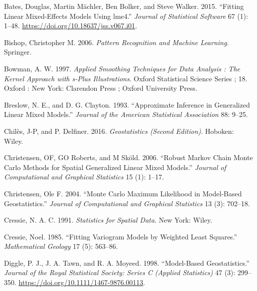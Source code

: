 \documentclass[
  letterpaper,
]{krantz}
\newlength{\cslhangindent}
\newlength{\cslentryspacingunit} %
\newenvironment{CSLReferences}[2] %
 {%
  \setlength{\parindent}{0pt}
  \ifodd #1
  \let\oldpar\par
  \def\par{\hangindent=\cslhangindent\oldpar}
  \fi
  \setlength{\parskip}{#2\cslentryspacingunit}
 }%
 {}
\begin{document}
\hypertarget{refs}{}
\begin{CSLReferences}{1}{0}
\leavevmode{}%
Bates, Douglas, Martin Mächler, Ben Bolker, and Steve Walker. 2015.
{``Fitting Linear Mixed-Effects Models Using {lme4}.''} \emph{Journal of
Statistical Software} 67 (1): 1--48.
\url{https://doi.org/10.18637/jss.v067.i01}.

\leavevmode{}%
Bishop, Christopher M. 2006. \emph{Pattern Recognition and Machine
Learning}. Springer.

\leavevmode{}%
Bowman, A. W. 1997. \emph{Applied Smoothing Techniques for Data Analysis
: The Kernel Approach with s-Plus Illustrations}. Oxford Statistical
Science Series ; 18. Oxford : New York: Clarendon Press ; Oxford
University Press.

\leavevmode{}%
Breslow, N. E., and D. G. Clayton. 1993. {``Approximate Inference in
Generalized Linear Mixed Models.''} \emph{Journal of the American
Statistical Association} 88: 9--25.

\leavevmode{}%
Chilès, J-P, and P. Delfiner. 2016. \emph{Geostatistics (Second
Edition)}. Hoboken: Wiley.

\leavevmode{}%
Christensen, OF, GO Roberts, and M Sköld. 2006. {``Robust Markov Chain
Monte Carlo Methods for Spatial Generalized Linear Mixed Models.''}
\emph{Journal of Computational and Graphical Statistics} 15 (1): 1--17.

\leavevmode{}%
Christensen, Ole F. 2004. {``Monte Carlo Maximum Likelihood in
Model-Based Geostatistics.''} \emph{Journal of Computational and
Graphical Statistics} 13 (3): 702--18.

\leavevmode{}%
Cressie, N. A. C. 1991. \emph{Statistics for Spatial Data}. New York:
Wiley.

\leavevmode{}%
Cressie, Noel. 1985. {``Fitting Variogram Models by Weighted Least
Squares.''} \emph{Mathematical Geology} 17 (5): 563--86.

\leavevmode{}%
Diggle, P. J., J. A. Tawn, and R. A. Moyeed. 1998. {``Model-Based
Geostatistics.''} \emph{Journal of the Royal Statistical Society: Series
C (Applied Statistics)} 47 (3): 299--350.
\url{https://doi.org/10.1111/1467-9876.00113}.


\end{CSLReferences}
\end{document}
